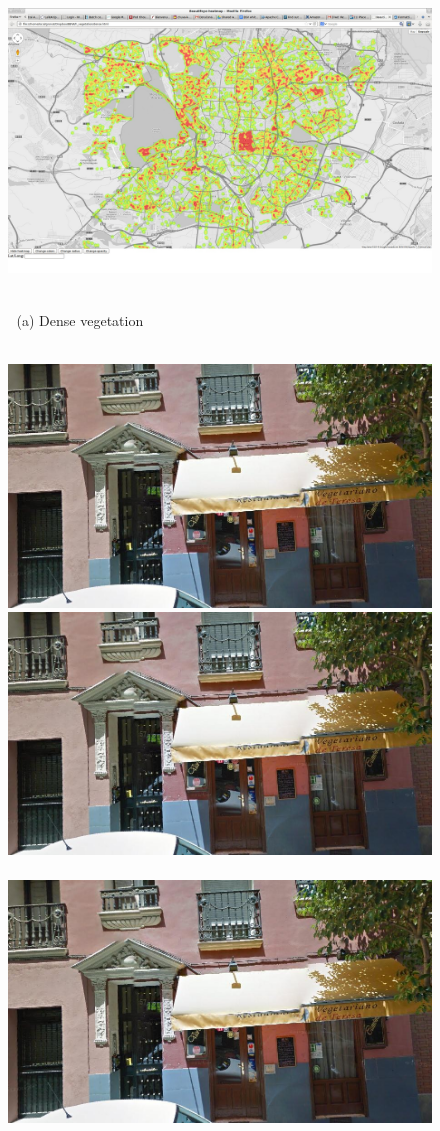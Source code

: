 \documentclass[runningheads]{llncs}
\begin{document}
\begin{figure}
\begin{minipage}{\linewidth}
\begin{minipage}{0.3\linewidth}
    \end{minipage}
    \begin{minipage}{0.7\linewidth}
      \includegraphics[trim= 350 150 250 150, clip=true, width=\linewidth]{imgs/vege/mapT2.jpg}
    \end{minipage}
  \end{minipage}
  \\
  $\;$ \hspace{30mm} (a) Dense vegetation
  \\
  \\
  \begin{minipage}{\linewidth}
    \begin{minipage}{0.3\linewidth}
      \includegraphics[width=0.49\linewidth]{imgs/cutout_pitch04.jpg}
      \includegraphics[width=0.49\linewidth]{imgs/cutout_pitch04.jpg}
      \\ \vspace{-3mm} \\
      \includegraphics[width=0.49\linewidth]{imgs/cutout_pitch04.jpg}

\end{minipage}
\end{minipage}
\end{figure}
\end{document}
